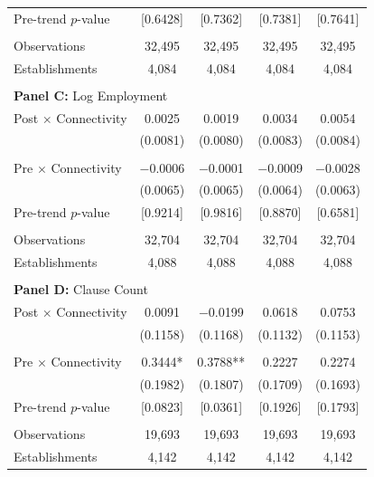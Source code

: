 \begin{table}[H]
\begin{threeparttable}
\begin{tabular}{lcccc}
Pre-trend $p$-value & [0.6428] & [0.7362] & [0.7381] & [0.7641] \\
  &  &  &  & \\
Observations & 32{,}495 & 32{,}495 & 32{,}495 & 32{,}495 \\
Establishments & 4{,}084 & 4{,}084 & 4{,}084 & 4{,}084 \\
  &  &  &  & \\
\midrule
\multicolumn{5}{l}{\textbf{Panel C:} Log Employment} \\
\midrule
Post $\times$ Connectivity & 0.0025 & 0.0019 & 0.0034 & 0.0054 \\
  & (0.0081) & (0.0080) & (0.0083) & (0.0084) \\
  &  &  &  & \\
Pre $\times$ Connectivity & $-$0.0006 & $-$0.0001 & $-$0.0009 & $-$0.0028 \\
  & (0.0065) & (0.0065) & (0.0064) & (0.0063) \\
Pre-trend $p$-value & [0.9214] & [0.9816] & [0.8870] & [0.6581] \\
  &  &  &  & \\
Observations & 32{,}704 & 32{,}704 & 32{,}704 & 32{,}704 \\
Establishments & 4{,}088 & 4{,}088 & 4{,}088 & 4{,}088 \\
  &  &  &  & \\
\midrule
\multicolumn{5}{l}{\textbf{Panel D:} Clause Count} \\
\midrule
Post $\times$ Connectivity & 0.0091 & $-$0.0199 & 0.0618 & 0.0753 \\
  & (0.1158) & (0.1168) & (0.1132) & (0.1153) \\
  &  &  &  & \\
Pre $\times$ Connectivity & 0.3444* & 0.3788** & 0.2227 & 0.2274 \\
  & (0.1982) & (0.1807) & (0.1709) & (0.1693) \\
Pre-trend $p$-value & [0.0823] & [0.0361] & [0.1926] & [0.1793] \\
  &  &  &  & \\
Observations & 19{,}693 & 19{,}693 & 19{,}693 & 19{,}693 \\
Establishments & 4{,}142 & 4{,}142 & 4{,}142 & 4{,}142 \\
\bottomrule
\end{tabular}
\scriptsize
\begin{tablenotes}

\end{tablenotes}
\end{threeparttable}
\end{table}
